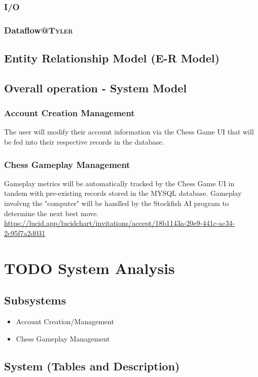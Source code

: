 \documentclass[11pt]{article}
\begin{document}
\subsubsection{I/O}
\label{sec:org96bac8e}
\subsubsection{Dataflow\hfill{}\textsc{@Tyler}}
\label{sec:org886bca1}
\subsection{Entity Relationship Model (E-R Model)}
\label{sec:org8612038}
\subsection{Overall operation - System Model}
\label{sec:orge4f92e0}
\subsubsection{Account Creation Management}
\label{sec:org2b4d77d}
The user will modify their account information via the Chess Game
UI that will be fed into their respective records in the database.
\subsubsection{Chess Gameplay Management}
\label{sec:org954780c}
Gameplay metrics will be automatically tracked by the Chess Game
UI in tandem with pre-existing records stored in the MYSQL
database.
Gameplay involvng the "computer" will be handled by the Stockfish
AI program to determine the next best move.
\url{https://lucid.app/lucidchart/invitations/accept/18b1143a-20e9-441c-ac34-2c95f7a2d031}
\section{{\bfseries\sffamily TODO} System Analysis}
\label{sec:org7a93f7c}
\subsection{Subsystems}
\label{sec:org1df2010}
\begin{itemize}
\item Account Creation/Management
\item Chess Gameplay Management
\end{itemize}
\subsection{System (Tables and Description)}
\label{sec:org45fda9e}
\end{document}
